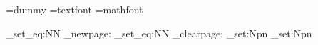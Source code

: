 
\pdfpagewidth 200cm
\setlength{\textwidth}{190cm}
\setlength{\paperwidth}{200cm}
\pdfpageheight 297mm
\setlength{\paperheight}{297mm}
\setlength{\textheight}{250mm}


\font\dummyfont=dummy
\font\tfont=textfont
\font\mathfont=mathfont
\renewcommand\normalsize{%
  \fontsize{10pt}{12pt}\fontfamily\ttdefault\selectfont
\tfont
}
\let\tiny=\relax
\let\small=\relax
\let\large=\relax
\let\Large=\relax
\let\huge=\relax
\let\Huge=\relax

\let\@listi\@empty
\let\@listii\@empty
\let\@listiii\@empty
\let\@listiv\@empty
\let\@listv\@empty

\raggedbottom
\frenchspacing
\raggedright

\parskip=12pt
\let\bigskip\par

\pagestyle{empty}
\thispagestyle{empty}
\renewcommand\pagestyle[1]{}
\renewcommand\thispagestyle[1]{}

\let\hfill=\relax
\let\hfil=\relax %
\renewcommand{\setlength}[2]{}
\let\noindent\relax

\cs_set_eq:NN \txt_newpage: \newpage
\cs_set_eq:NN \txt_clearpage: \clearpage
\cs_set:Npn \newpage {}
\cs_set:Npn \clearpage {}
\renewcommand{\pagebreak}[1][]{}

%

